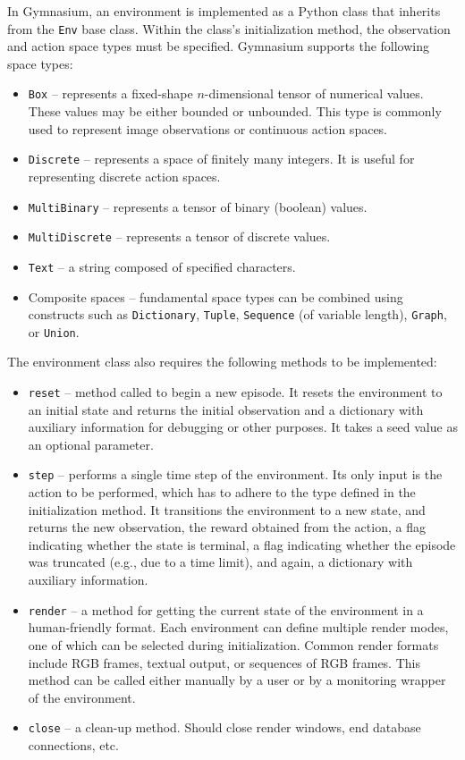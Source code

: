 \documentclass[
  digital,     %
  oneside,     %
  nosansbold,  %
  nocolorbold, %
  lof,         %
  lot,         %
]{fithesis4}
\begin{document}
In Gymnasium, an environment is implemented as a Python class that inherits from the \texttt{Env} base class. Within the class's initialization method, the observation and action space types must be specified. Gymnasium supports the following space types:

\begin{itemize}
    \item \texttt{Box} -- represents a fixed-shape $n$-dimensional tensor of numerical values. These values may be either bounded or unbounded. This type is commonly used to represent image observations or continuous action spaces.
    \item \texttt{Discrete} -- represents a space of finitely many integers. It is useful for representing discrete action spaces.
    \item \texttt{MultiBinary} -- represents a tensor of binary (boolean) values.
    \item \texttt{MultiDiscrete} -- represents a tensor of discrete values.
    \item \texttt{Text} -- a string composed of specified characters.
    \item Composite spaces -- fundamental space types can be combined using constructs such as \texttt{Dictionary}, \texttt{Tuple}, \texttt{Sequence} (of variable length), \texttt{Graph}, or \texttt{Union}.
\end{itemize}

The environment class also requires the following methods to be implemented:

\begin{itemize}
    \item \texttt{reset} -- method called to begin a new episode. It resets the environment to an initial state and returns the initial observation and a dictionary with auxiliary information for debugging or other purposes. It takes a seed value as an optional parameter.
    \item \texttt{step} -- performs a single time step of the environment. Its only input is the action to be performed, which has to adhere to the type defined in the initialization method. It transitions the environment to a new state, and returns the new observation, the reward obtained from the action, a flag indicating whether the state is terminal, a flag indicating whether the episode was truncated (e.g., due to a time limit), and again, a dictionary with auxiliary information.
    \item \texttt{render} -- a method for getting the current state of the environment in a human-friendly format. Each environment can define multiple render modes, one of which can be selected during initialization. Common render formats include RGB frames, textual output, or sequences of RGB frames. This method can be called either manually by a user or by a monitoring wrapper of the environment.
    \item \texttt{close} -- a clean-up method. Should close render windows, end database connections, etc.
\end{itemize}
\end{document}
